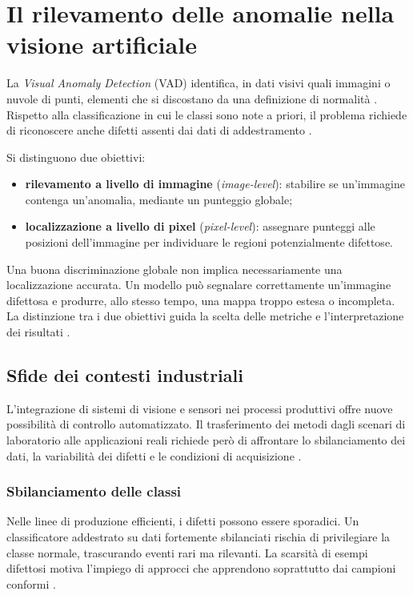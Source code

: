 \section[Anomalie nella visione artificiale]{Il rilevamento delle anomalie nella visione artificiale}

La \textit{Visual Anomaly Detection} (VAD) identifica, in dati visivi quali immagini o nuvole di punti, elementi che si discostano da una definizione di normalità \cite{Cao_et_al._2024}. Rispetto alla classificazione in cui le classi sono note a priori, il problema richiede di riconoscere anche difetti assenti dai dati di addestramento \cite{Yang_et_al._2021}.

Si distinguono due obiettivi:
\begin{itemize}
    \item \textbf{rilevamento a livello di immagine} (\textit{image-level}): stabilire se un'immagine contenga un'anomalia, mediante un punteggio globale;
    \item \textbf{localizzazione a livello di pixel} (\textit{pixel-level}): assegnare punteggi alle posizioni dell'immagine per individuare le regioni potenzialmente difettose.
\end{itemize}

Una buona discriminazione globale non implica necessariamente una localizzazione accurata. Un modello può segnalare correttamente un'immagine difettosa e produrre, allo stesso tempo, una mappa troppo estesa o incompleta. La distinzione tra i due obiettivi guida la scelta delle metriche e l'interpretazione dei risultati \cite{Yang_et_al._2021,Pang_et_al._2021}.

\subsection{Sfide dei contesti industriali}

L'integrazione di sistemi di visione e sensori nei processi produttivi offre nuove possibilità di controllo automatizzato. Il trasferimento dei metodi dagli scenari di laboratorio alle applicazioni reali richiede però di affrontare lo sbilanciamento dei dati, la variabilità dei difetti e le condizioni di acquisizione \cite{Cui_et_al._2023,Li_et_al._2025}.

\subsubsection{Sbilanciamento delle classi}

Nelle linee di produzione efficienti, i difetti possono essere sporadici. Un classificatore addestrato su dati fortemente sbilanciati rischia di privilegiare la classe normale, trascurando eventi rari ma rilevanti. La scarsità di esempi difettosi motiva l'impiego di approcci che apprendono soprattutto dai campioni conformi \cite{Li_et_al._2025,Aggarwal_et_al._2021}.

